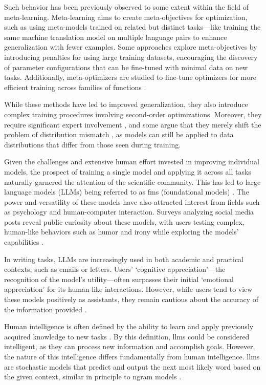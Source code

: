 Such behavior has been previously observed to some extent within the field of meta-learning. Meta-learning aims to create meta-objectives for optimization, such as using meta-models trained on related but distinct tasks—like training the same machine translation model on multiple language pairs to enhance generalization with fewer examples. Some approaches explore meta-objectives by introducing penalties for using large training datasets, encouraging the discovery of parameter configurations that can be fine-tuned with minimal data on new tasks. Additionally, meta-optimizers are studied to fine-tune optimizers for more efficient training across families of functions \cite{metalearning}.

\pskip

While these methods have led to improved generalization, they also introduce complex training procedures involving second-order optimizations. Moreover, they require significant expert involvement \cite{Yao2018TakingHO}, and some argue that they merely shift the problem of distribution mismatch \cite{wiles2021finegrainedanalysisdistributionshift}, as models can still be applied to data distributions that differ from those seen during training.

\pskip

Given the challenges and extensive human effort invested in improving individual models, the prospect of training a single model and applying it across all tasks naturally garnered the attention of the scientific community. This has led to large language models (LLMs) being referred to as \glspl{fm} (foundational models) \cite{foundationalmodels}. The power and versatility of these models have also attracted interest from fields such as psychology and human-computer interaction. Surveys analyzing social media posts reveal public curiosity about these models, with users testing complex, human-like behaviors such as humor and irony while exploring the models' capabilities \cite{Dynel2023}.

\pskip

In writing tasks, LLMs are increasingly used in both academic and practical contexts, such as emails or letters. Users' ‘cognitive appreciation'—the recognition of the model's utility—often surpasses their initial ‘emotional appreciation' for its human-like interactions. However, while users tend to view these models positively as assistants, they remain cautious about the accuracy of the information provided \cite{Luther2024} \cite{XinXiaCao2023} \cite{Herbold2023}.

\pskip

Human intelligence is often defined by the ability to learn and apply previously acquired knowledge to new tasks \cite{Sternberg2012}. By this definition, \glspl{llm} could be considered intelligent, as they can process new information and accomplish goals. However, the nature of this intelligence differs fundamentally from human intelligence. \glspl{llm} are stochastic models that predict and output the next most likely word based on the given context, similar in principle to \gls{ngram} models \cite{brown1992class}.